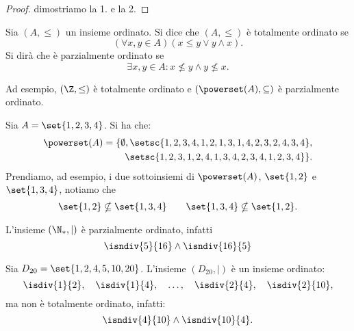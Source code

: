 \begin{proof}
    dimostriamo la 1. e la 2.
\end{proof}



\begin{definition}\label{def:insieme_totalmente_ordinato}
    Sia \((A, \leq)\) un insieme ordinato. Si dice che \((A, \leq)\) è totalmente ordinato se
    \[
        (\forall x,y \in A) (x \leq y \lor y \land x).
    \]
    Si dirà che è parzialmente ordinato se
    \[
        \exists x,y \in A : x \nleq y \land y \nleq x.
    \]
\end{definition}

Ad esempio, \((\Z, \leq)\) è totalmente ordinato e \((\powerset(A), \subseteq)\) è parzialmente ordinato.

\begin{example}
    Sia \(A = \set{1, 2, 3, 4}\). Si ha che:
    \begin{equation*}
    \begin{split}
        \powerset(A) = \{\emptyset, 
            \setsc{1, 2, 3, 4, {1, 2}, {1, 3}, {1, 4}, {2, 3}, {2, 4}, {3, 4}}, \\
            \setsc{{1, 2, 3}, {1, 2, 4}, {1, 3, 4}, {2, 3, 4}, {1, 2, 3, 4}} 
        \}.
    \end{split}
    \end{equation*}
    Prendiamo, ad esempio, i due sottoinsiemi di \(\powerset(A)\), \(\set{1, 2}\) e \(\set{1, 3, 4}\), notiamo che
    \[
        \set{1, 2} \nsubseteq \set{1, 3, 4}
        \qquad
        \set{1, 3, 4} \nsubseteq \set{1, 2}.
    \]
\end{example}

\begin{example}
    L'insieme \((\N_*, \mid)\) è parzialmente ordinato, infatti
    \[
        \isndiv{5}{16} \land \isndiv{16}{5}
    \]
\end{example}

\begin{example}
    Sia \(D_{20} = \set{1, 2, 4, 5, 10, 20}\). L'insieme \((D_{20}, \mid)\) è un insieme ordinato:
    \[
        \isdiv{1}{2}, \quad
        \isdiv{1}{4}, \quad
        \dotsc,       \quad
        \isdiv{2}{4}, \quad
        \isdiv{2}{10},
    \]
    ma non è totalmente ordinato, infatti:
    \[
        \isndiv{4}{10} \land \isndiv{10}{4}.
    \]
\end{example}

